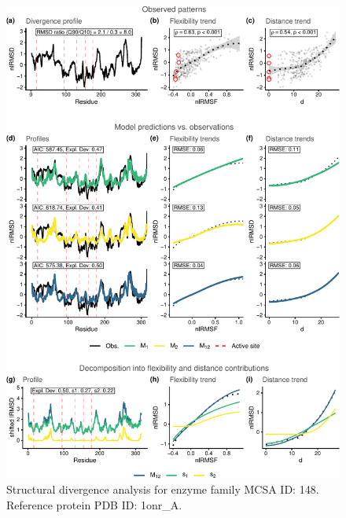 \documentclass[
]{article}
\begin{document}
\clearpage
\begin{figure}[H]
\centering


\begin{center}\includegraphics{supplementary_material_files/figure-latex/generate_figures-6} \end{center}

\caption{Structural divergence analysis for enzyme family MCSA ID: 148. Reference protein PDB ID: 1onr\_A.}
\end{figure}
\end{document}
